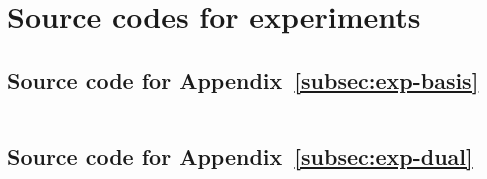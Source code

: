 \section{Source codes for experiments}
\label{sec:code}

\subsection{Source code for Appendix~\ref{subsec:exp-basis}}
\label{subsec:code-basis}

\begin{lstlisting}[language=Python, caption={Experiment for the reduced norm of basis elements before ideal multiplication}, label={lst:sage_init}]

\end{lstlisting}

\subsection{Source code for Appendix~\ref{subsec:exp-dual}}
\label{subsec:code-dual}